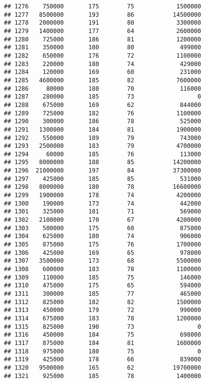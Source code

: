 \documentclass[
]{article}
\begin{document}
\begin{verbatim}
## 1276    750000       175        75            1500000
## 1277   8500000       193        86           14500000
## 1278   2000000       191        80            3300000
## 1279   1400000       177        64            2600000
## 1280    725000       186        81            1200000
## 1281    350000       180        80             499000
## 1282    650000       176        72            1100000
## 1283    220000       180        74             429000
## 1284    120000       169        60             231000
## 1285   4600000       185        82            7600000
## 1286     80000       180        70             116000
## 1287    280000       185        73                  0
## 1288    675000       169        62             844000
## 1289    725000       182        76            1100000
## 1290    300000       186        78             525000
## 1291   1300000       184        81            1900000
## 1292    550000       189        79             743000
## 1293   2500000       183        79            4700000
## 1294     60000       185        76             113000
## 1295   8000000       188        85           14200000
## 1296  21000000       197        84           37300000
## 1297    425000       185        85             531000
## 1298   8000000       180        78           16600000
## 1299   1900000       178        74            4200000
## 1300    190000       173        74             442000
## 1301    325000       181        71             569000
## 1302   2100000       170        67            4200000
## 1303    500000       175        60             875000
## 1304    625000       180        74             906000
## 1305    875000       175        76            1700000
## 1306    425000       169        65             978000
## 1307   3500000       173        68            5500000
## 1308    600000       183        78            1100000
## 1309    110000       185        75             146000
## 1310    475000       175        65             594000
## 1311    300000       185        77             465000
## 1312    825000       182        82            1500000
## 1313    450000       179        72             990000
## 1314    675000       183        78            1200000
## 1315    825000       190        73                  0
## 1316    450000       184        75             698000
## 1317    875000       184        81            1600000
## 1318    975000       180        75                  0
## 1319    425000       178        66             839000
## 1320   9500000       165        62           19700000
## 1321    925000       185        78            1400000

\end{verbatim}
\end{document}
